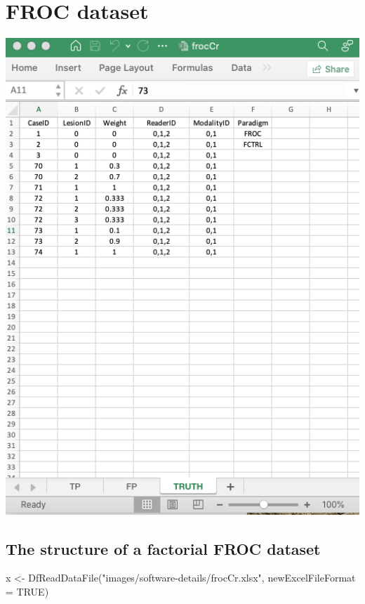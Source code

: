 \documentclass[
]{book}
\newenvironment{Shaded}{\begin{snugshade}}{\end{snugshade}}
\newcommand{\AttributeTok}[1]{\textcolor[rgb]{0.77,0.63,0.00}{#1}}
\newcommand{\ConstantTok}[1]{\textcolor[rgb]{0.00,0.00,0.00}{#1}}
\newcommand{\FunctionTok}[1]{\textcolor[rgb]{0.00,0.00,0.00}{#1}}
\newcommand{\NormalTok}[1]{#1}
\newcommand{\OtherTok}[1]{\textcolor[rgb]{0.56,0.35,0.01}{#1}}
\newcommand{\StringTok}[1]{\textcolor[rgb]{0.31,0.60,0.02}{#1}}
\begin{document}
\hypertarget{dataset-object-details-froc-dataset}{%
\section{FROC dataset}\label{dataset-object-details-froc-dataset}}

\includegraphics[width=1\textwidth,height=\textheight]{images/software-details/frocCrTruth.png}

\hypertarget{dataset-object-details-structure-froc-dataset}{%
\subsection{The structure of a factorial FROC dataset}\label{dataset-object-details-structure-froc-dataset}}

\begin{Shaded}
\begin{Highlighting}[]
\NormalTok{x }\OtherTok{\textless{}{-}} \FunctionTok{DfReadDataFile}\NormalTok{(}\StringTok{"images/software{-}details/frocCr.xlsx"}\NormalTok{, }\AttributeTok{newExcelFileFormat =} \ConstantTok{TRUE}\NormalTok{)}
\end{Highlighting}
\end{Shaded}
\end{document}
